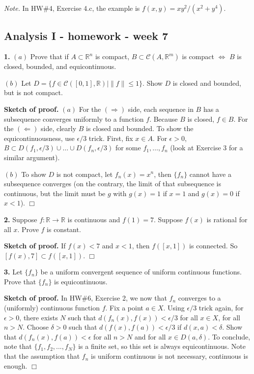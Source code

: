 \documentclass{article}
\begin{document}
    
    
    
    
    

    
    \emph{Note.} In HW\#4, Exercise 4.c, the example is
$f(x,y) = xy^2/(x^2+y^4)$.

    \subsection*{Analysis I - homework - week
7}\label{analysis-i---homework---week-7}

    \textbf{1.} $(a)$ Prove that if $A\subset \mathbb{R}^n$ is compact,
$B \subset\mathcal{C}(A, \mathbb{R}^m)$ is compact $\Leftrightarrow$ $B$
is closed, bounded, and equicontinuous.

$(b)$ Let $D = \{f \in\mathcal{C}([0,1], \mathbb{R}) \mid \|f\|\le 1\}$.
Show $D$ is closed and bounded, but is not compact.

\textbf{Sketch of proof.} $(a)$ For the $(\Rightarrow)$ side, each
sequence in $B$ has a subsequence converges uniformly to a function $f$.
Because $B$ is closed, $f\in B$. For the $(\Leftarrow)$ side, clearly
$B$ is closed and bounded. To show the equicontinuousness, use
$\epsilon/3$ trick. First, fix $x\in A$. For $\epsilon >0$,
$B \subset D(f_1,\epsilon/3)\cup \ldots \cup D(f_n,\epsilon/3)$ for some
$f_1,\ldots,f_n$ (look at Exercise 3 for a similar argument).

$(b)$ To show $D$ is not compact, let $f_n(x) = x^n$, then $\{f_n\}$
cannot have a subsequence converges (on the contrary, the limit of that
subsequence is continuous, but the limit must be $g$ with $g(x) = 1$ if
$x =1$ and $g(x)=0$ if $x < 1$). $\Box$

    \textbf{2.} Suppose $f:\mathbb{R}\to\mathbb{R}$ is continuous and
$f(1) = 7$. Suppose $f(x)$ is rational for all $x$. Prove $f$ is
constant.

\textbf{Sketch of proof.} If $f(x) < 7$ and $x < 1$, then $f([x,1])$ is
connected. So $[f(x) , 7] \subset f([x,1])$. $\Box$

    \textbf{3.} Let $\{f_n\}$ be a uniform convergent sequence of uniform
continuous functions. Prove that $\{f_n\}$ is equicontinuous.

\textbf{Sketch of proof.} In HW\#6, Exercise 2, we now that $f_n$
converges to a (uniformly) continuous function $f$. Fix a point
$a \in X$. Using $\epsilon/3$ trick again, for $\epsilon > 0$, there
exists $N$ such that $d(f_n(x),f(x)) < \epsilon/3$ for all $x\in X$, for
all $n > N$. Choose $\delta > 0$ such that $d(f(x),f(a)) < \epsilon /3$
if $d(x,a) < \delta$. Show that $d(f_n(x),f(a)) < \epsilon$ for all
$n > N$ and for all $x \in D(a,\delta)$. To conclude, note that
$\{f_1,f_2,...,f_N\}$ is a finite set, so this set is always
equicontinuous. Note that the assumption that $f_n$ is uniform
continuous is not necessary, continuous is enough. $\Box$
\end{document}
